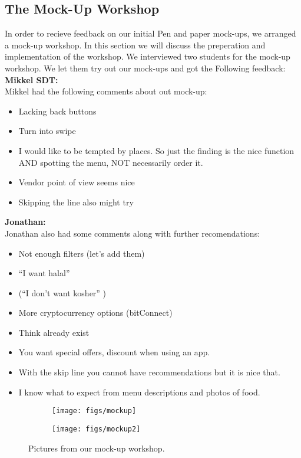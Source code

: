 \subsection{The Mock-Up Workshop}
In order to recieve feedback on our initial Pen and paper mock-ups, we arranged a mock-up workshop.
In this section we will discuss the preperation and implementation of the workshop. We interviewed two students for the mock-up workshop. We let them try out our mock-ups and got the Following feedback:\\
\textbf{Mikkel SDT:}\\
Mikkel had the following comments about out mock-up:

\begin{itemize}
    \item Lacking back buttons
    \item Turn into swipe
    \item I would like to be tempted by places. So just the finding is the nice function AND spotting the menu, NOT necessarily order it.
    \item Vendor point of view seems nice
    \item Skipping the line also might try
\end{itemize}
\textbf{Jonathan:}\\
Jonathan also had some comments along with further recomendations:

\begin{itemize}
    \item Not enough filters (let’s add them)
    \item “I want halal”
    \item (“I don’t want kosher”  )
    \item More cryptocurrency options (bitConnect)
    \item Think already exist
    \item You want special offers, discount when using an app.
    \item With the skip line you cannot have recommendations but it is nice that.
    \item I know what to expect from menu descriptions and photos of food.
\end{itemize}


\begin{figure}[h!]
    \centering
    \begin{subfigure}[b]{0.475\textwidth}
        \centering
        \texttt{[image: figs/mockup]}
    \end{subfigure}
    \hfill
    \begin{subfigure}[b]{0.475\textwidth}
        \centering
        \texttt{[image: figs/mockup2]}
    \end{subfigure}
    \label{mockup1}
    \caption{Pictures from our mock-up workshop.}
\end{figure}



